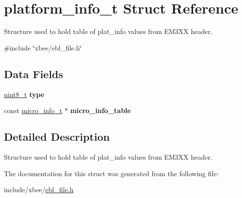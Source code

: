 \hypertarget{structplatform__info__t}{\section{platform\-\_\-info\-\_\-t Struct Reference}
\label{structplatform__info__t}
}


Structure used to hold table of plat\-\_\-info values from E\-M3\-X\-X header.  




{\ttfamily \#include \char`\"{}xbee/ebl\-\_\-file.\-h\char`\"{}}

\subsection*{Data Fields}
\begin{DoxyCompactItemize}
\item 
\hypertarget{structplatform__info__t_a1d127017fb298b889f4ba24752d08b8e}{\hyperlink{group__hal_gae1affc9ca37cfb624959c866a73f83c2}{uint8\-\_\-t} {\bfseries type}}\label{structplatform__info__t_a1d127017fb298b889f4ba24752d08b8e}

\item 
\hypertarget{structplatform__info__t_a0dff09beac42b5dd21d6a314b0589ef1}{const \hyperlink{structmicro__info__t}{micro\-\_\-info\-\_\-t} $\ast$ {\bfseries micro\-\_\-info\-\_\-table}}\label{structplatform__info__t_a0dff09beac42b5dd21d6a314b0589ef1}

\end{DoxyCompactItemize}


\subsection{Detailed Description}
Structure used to hold table of plat\-\_\-info values from E\-M3\-X\-X header. 

The documentation for this struct was generated from the following file\-:\begin{DoxyCompactItemize}
\item 
include/xbee/\hyperlink{ebl__file_8h}{ebl\-\_\-file.\-h}\end{DoxyCompactItemize}
